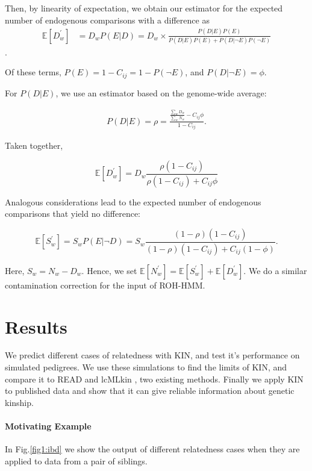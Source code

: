 \documentclass[12pt, letterpaper]{article}
\begin{document}
Then, by linearity of expectation, we obtain our estimator for the expected number of endogenous comparisons with a difference as 
\begin{align}
    \mathbb{E}[D_w^{'}] &= D_{w} P(E|D) = D_{w} \times \frac{P(D|E)P(E)}{P(D|E)P(E) + P(D| \neg E)P( \neg E)}
\end{align}.

Of these terms, $P(E)= 1 -C_{ij} = 1 - P(\neg E)$, and $P(D| \neg E) = \phi$.

For $P(D|E)$, we use an estimator based on the genome-wide average: 

\begin{align}
    P(D|E) = \rho = \frac{\frac{\sum_w D_w}{\sum_w N_w} - C_{ij} \phi}{1 - C_{ij}}.
\end{align}

Taken together, 

\begin{equation}
 \mathbb{E}[D_w^{'}]= D_{w}\frac{\rho (1-C_{ij})}{\rho(1-C_{ij}) + C_{ij}\phi}
 \end{equation}
 
 Analogous considerations lead to the expected number of endogenous comparisons that yield no difference:
 
 \begin{equation}
\mathbb{E}[S_w^{'}] = S_{w} P(E| \neg D) = S_{w} \frac{(1-\rho)(1-C_{ij})}{(1-\rho)(1-C_{ij}) + C_{ij}(1-\phi)}.
 \end{equation}

Here, $S_w = N_w - D_w$. Hence, we set $\mathbb{E}[N_w^{'}] = \mathbb{E}[S_w^{'}] + \mathbb{E}[D_w^{'}]$. We do a similar contamination correction for the input of ROH-HMM.




\section{Results}\label{results}



We predict different cases of relatedness with KIN, and test it's performance on simulated pedigrees. We use these simulations to find the limits of KIN, and compare it to READ and lcMLkin \cite{lipatov_maximum_2015}, two existing methods. Finally we apply KIN to published data and show that it can give reliable information about genetic kinship.

\paragraph{Motivating Example}
In Fig.\ref{fig1:ibd} we show the output of different relatedness cases when they are applied to data from a pair of siblings.
\end{document}
